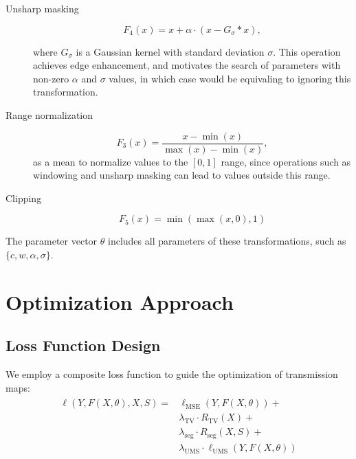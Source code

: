 \documentclass[nomenclature, english, bibtex]{kththesis}
\numberwithin{listing}{chapter}
\begin{document}
\begin{description}
\item[Unsharp masking]
\begin{equation}
    F_4(x) = x + \alpha \cdot (x - G_\sigma * x),
\end{equation}

where $G_\sigma$ is a Gaussian kernel with standard deviation $\sigma$.
This operation achieves edge enhancement, and motivates the search of parameters with non-zero $\alpha$ and $\sigma$ values,
in which case would be equivaling to ignoring this transformation.

\item[Range normalization]
\begin{equation}
    F_3(x) = \frac{x - \min(x)}{\max(x) - \min(x)},
\end{equation}
as a mean to normalize values to the $[0,1]$
range, since operations such as windowing and unsharp masking can lead to values outside this range.

\item[Clipping]
\begin{equation}
    F_5(x) = \min(\max(x, 0), 1)
\end{equation}
\end{description}

The parameter vector $\theta$ includes all parameters of these transformations, such as $\{c, w, \alpha, \sigma\}$.

\section{Optimization Approach}
\subsection{Loss Function Design}
We employ a composite loss function to guide the optimization of transmission maps:
\begin{align}
    \begin{split}
    \ell(Y, F(X, \theta), X, S) = &\ell_{\text{MSE}}(Y, F(X, \theta)) +  \\
                                &\lambda_{\text{TV}} \cdot R_{\text{TV}}(X) + \\
                                &\lambda_{\text{seg}} \cdot R_{\text{seg}}(X, S) + \\
                                &\lambda_{\text{UMS}} \cdot \ell_{\text{UMS}}(Y, F(X, \theta))
    \end{split}
\end{align}
\end{document}
